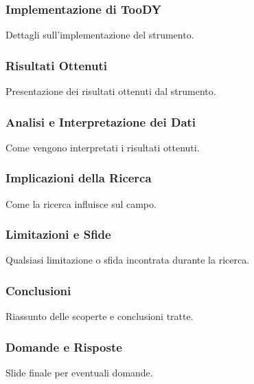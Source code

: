 \documentclass{beamer}
\begin{document}
\begin{frame}
\frametitle{Implementazione di TooDY}
Dettagli sull'implementazione del strumento.
\end{frame}


\begin{frame}
\frametitle{Risultati Ottenuti}
Presentazione dei risultati ottenuti dal strumento.
\end{frame}


\begin{frame}
\frametitle{Analisi e Interpretazione dei Dati}
Come vengono interpretati i risultati ottenuti.
\end{frame}


\begin{frame}
\frametitle{Implicazioni della Ricerca}
Come la ricerca influisce sul campo.
\end{frame}


\begin{frame}
\frametitle{Limitazioni e Sfide}
Qualsiasi limitazione o sfida incontrata durante la ricerca.
\end{frame}


\begin{frame}
\frametitle{Conclusioni}
Riassunto delle scoperte e conclusioni tratte.
\end{frame}


\begin{frame}
\frametitle{Domande e Risposte}
Slide finale per eventuali domande.
\end{frame}
\end{document}
